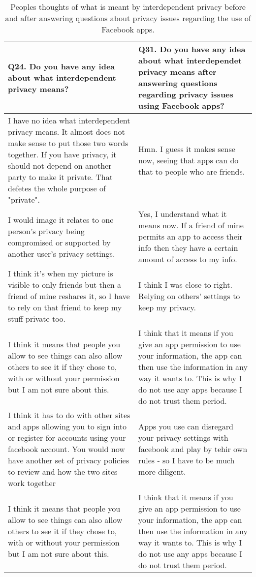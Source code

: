 
\begin{center}
\begin{longtable}{ | p{6cm} | p{6cm} |}
    \caption{\label{tab:thoughtonintpriv}Peoples thoughts of what is meant by interdependent privacy before and after answering questions about privacy issues regarding the use of Facebook apps.} \\
    \hline
\textbf{Q24. Do you have any idea about what interdependent privacy means?} & \textbf{Q31. Do you have any idea about what interdependet privacy means after answering questions regarding privacy issues using Facebook apps?} \\ 
\hline
I have no idea what interdependent privacy means. It almost does not make sense to put those two words together. If you have privacy, it should not depend on another party to make it private. That defetes the whole purpose of "private". &  Hmn. I guess it makes sense now, seeing that apps can do that to people who are friends.\\ 
    \hline
I would image it relates to one person's privacy being compromised or supported by another user's privacy settings. & Yes, I understand what it means now. If a friend of mine permits an app to access their info then they have a certain amount of access to my info.\\ 
    \hline
I think it's when my picture is visible to only friends but then a friend of mine reshares it, so I have to rely on that friend to keep my stuff private too. &  I think I was close to right. Relying on others' settings to keep my privacy.\\ 
    \hline
I think it means that people you allow to see things can also allow others to see it if they chose to, with or without your permission but I am not sure about this. & I think that it means if you give an app permission to use your information, the app can then use the information in any way it wants to. This is why I do not use any apps because I do not trust them period.\\
    \hline
I think it has to do with other sites and apps allowing you to sign into or register for accounts using your facebook account.  You would now have another set of privacy policies to review and how the two sites work together & Apps you use can disregard your privacy settings with facebook and play by tehir own rules - so I have to be much more diligent.\\
	\hline
I think it means that people you allow to see things can also allow others to see it if they chose to, with or without your permission but I am not sure about this. & I think that it means if you give an app permission to use your information, the app can then use the information in any way it wants to. This is why I do not use any apps because I do not trust them period.\\

\end{longtable}
\end{center}
